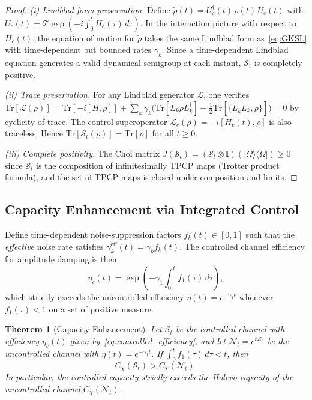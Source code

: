\documentclass[journal,twocolumn]{IEEEtran}
\theoremstyle{definition}
\theoremstyle{plain}
\newtheorem{theorem}{Theorem}[section]
\newcommand{\tensor}{\otimes}
\newcommand{\Tr}{\mathrm{Tr}}
\begin{document}
\begin{proof}
\textit{(i) Lindblad form preservation.}  Define
$\tilde\rho(t) = U_c^\dagger(t)\,\rho(t)\,U_c(t)$ with
$U_c(t) = \mathcal{T}\exp(-i\int_0^t H_c(\tau)\,d\tau)$.  In the
interaction picture with respect to $H_c(t)$, the equation of
motion for $\tilde\rho$ takes the same Lindblad form
as~\eqref{eq:GKSL} with time-dependent but bounded rates $\gamma_k$.
Since a time-dependent Lindblad equation generates a valid dynamical
semigroup at each instant, $\mathcal{S}_t$ is completely positive.

\textit{(ii) Trace preservation.}  For any Lindblad generator
$\mathcal{L}$, one verifies $\Tr[\mathcal{L}(\rho)] =
\Tr[-i[H,\rho]] + \sum_k \gamma_k\bigl(\Tr[L_k\rho L_k^\dagger]
- \tfrac{1}{2}\Tr[\{L_k^\dagger L_k, \rho\}]\bigr) = 0$ by
cyclicity of trace.  The control superoperator
$\mathcal{L}_c(\rho) = -i[H_c(t),\rho]$ is also traceless.
Hence $\Tr[\mathcal{S}_t(\rho)] = \Tr[\rho]$ for all $t \ge 0$.

\textit{(iii) Complete positivity.}  The Choi matrix
$J(\mathcal{S}_t) = (\mathcal{S}_t \tensor \mathbf{I})\!
(|\Omega\rangle\langle\Omega|) \ge 0$ since $\mathcal{S}_t$ is
the composition of infinitesimally TPCP maps (Trotter product
formula), and the set of TPCP maps is closed under composition and
limits.
\end{proof}

\subsection{Capacity Enhancement via Integrated Control}
\label{subsec:capacity_enhancement}

Define time-dependent noise-suppression factors $f_k(t) \in [0,1]$
such that the \emph{effective} noise rate satisfies
$\gamma_k^{\mathrm{eff}}(t) = \gamma_k f_k(t)$.  The controlled
channel efficiency for amplitude damping is then
\begin{equation}
  \eta_c(t) = \exp\!\left(-\gamma_1 \int_0^t f_1(\tau)\,d\tau\right),
  \label{eq:controlled_efficiency}
\end{equation}
which strictly exceeds the uncontrolled efficiency
$\eta(t) = e^{-\gamma_1 t}$ whenever $f_1(\tau) < 1$ on a set of
positive measure.

\begin{theorem}[Capacity Enhancement]
\label{thm:capacity_enhancement}
Let $\mathcal{S}_t$ be the controlled channel with efficiency
$\eta_c(t)$ given by~\eqref{eq:controlled_efficiency}, and let
$\mathcal{N}_t = e^{t\mathcal{L}_0}$ be the uncontrolled channel
with $\eta(t) = e^{-\gamma_1 t}$.  If $\int_0^t f_1(\tau)\,d\tau < t$,
then
\begin{equation}
  C_\chi(\mathcal{S}_t) > C_\chi(\mathcal{N}_t).
  \label{eq:cap_enhancement}
\end{equation}
In particular, the controlled capacity strictly exceeds the Holevo
capacity of the uncontrolled channel $C_\chi(\mathcal{N}_t)$.
\end{theorem}
\end{document}
